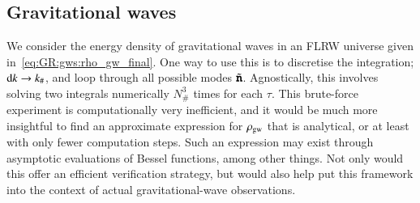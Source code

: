 \subsection{Gravitational waves}\label{sec:whatif:cont:gws}
We consider the energy density of gravitational waves in an FLRW universe given in~\cref{eq:GR:gws:rho_gw_final}. 
One way to use this is to discretise the integration; $\diff k \to k_\#$, and loop through all possible modes $\tilde{\boldsymbol{\mathtt{n}}}$. Agnostically, this involves solving two integrals numerically $N_\#^3$ times for each $\tau$. This brute-force experiment is computationally very inefficient, and it would be much more insightful to find an approximate expression for $\rho_\mathrm{gw}$ that is analytical, or at least with only fewer computation steps. %
Such an expression may exist through asymptotic evaluations of Bessel functions, among other things. Not only would this offer an efficient verification strategy, but would also help put this framework into the context of actual gravitational-wave observations.


